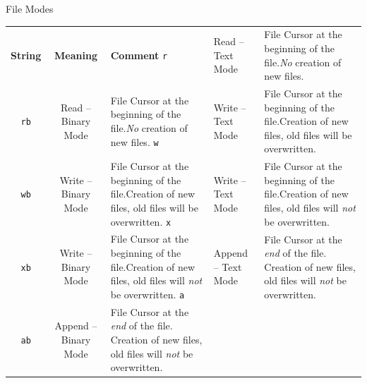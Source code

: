\begin{frame}[fragile]{File Modes}
%
\vspace{-12pt}
\begin{center}
\scriptsize
{}
\begin{tabular}{c|cp{.65\linewidth}}
	\toprule
	\textbf{String}	& \textbf{Meaning}         & \textbf{Comment} \tabcrlf
	\texttt{r}		& Read   -- Text Mode      & File Cursor at the beginning of the file.\newline \emph{No} creation of new files.\\
	\texttt{rb}		& Read   -- Binary Mode    & File Cursor at the beginning of the file.\newline \emph{No} creation of new files.\tabcrlf
	\texttt{w}		& Write  -- Text Mode      & File Cursor at the beginning of the file.\newline Creation of new files, old files will be overwritten.\\
	\texttt{wb}		& Write  -- Binary Mode    & File Cursor at the beginning of the file.\newline Creation of new files, old files will be overwritten.\tabcrlf
	\texttt{x}		& Write  -- Text Mode      & File Cursor at the beginning of the file.\newline Creation of new files, old files will \emph{not} be overwritten.\\
	\texttt{xb}		& Write  -- Binary Mode    & File Cursor at the beginning of the file.\newline Creation of new files, old files will \emph{not} be overwritten.\tabcrlf
	\texttt{a}		& Append -- Text Mode      & File Cursor at the \emph{end} of the file. Creation of new files, old files will \emph{not} be overwritten.\\
	\texttt{ab}		& Append -- Binary Mode    & File Cursor at the \emph{end} of the file. Creation of new files, old files will \emph{not} be overwritten. \\
	\bottomrule
\end{tabular}
\end{center}
%
\end{frame}


